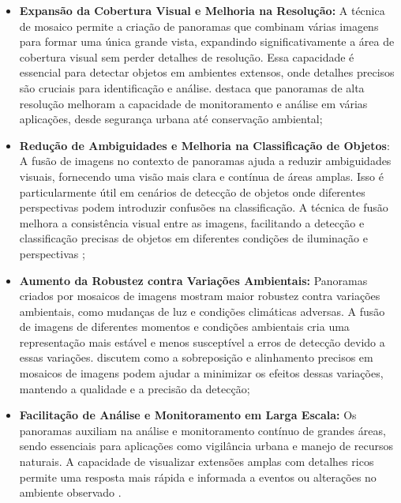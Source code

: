 \begin{itemize}

\item \textbf{Expansão da Cobertura Visual e Melhoria na Resolução:} A técnica de mosaico permite a criação de panoramas que combinam várias imagens para formar uma única grande vista, expandindo significativamente a área de cobertura visual sem perder detalhes de resolução. Essa capacidade é essencial para detectar objetos em ambientes extensos, onde detalhes precisos são cruciais para identificação e análise.  destaca que panoramas de alta resolução melhoram a capacidade de monitoramento e análise em várias aplicações, desde segurança urbana até conservação ambiental;

\item \textbf{Redução de Ambiguidades e Melhoria na Classificação de Objetos}: A fusão de imagens no contexto de panoramas ajuda a reduzir ambiguidades visuais, fornecendo uma visão mais clara e contínua de áreas amplas. Isso é particularmente útil em cenários de detecção de objetos onde diferentes perspectivas podem introduzir confusões na classificação. A técnica de fusão melhora a consistência visual entre as imagens, facilitando a detecção e classificação precisas de objetos em diferentes condições de iluminação e perspectivas \cite{Burt1983};

\item \textbf{Aumento da Robustez contra Variações Ambientais:} Panoramas criados por mosaicos de imagens mostram maior robustez contra variações ambientais, como mudanças de luz e condições climáticas adversas. A fusão de imagens de diferentes momentos e condições ambientais cria uma representação mais estável e menos susceptível a erros de detecção devido a essas variações.  discutem como a sobreposição e alinhamento precisos em mosaicos de imagens podem ajudar a minimizar os efeitos dessas variações, mantendo a qualidade e a precisão da detecção;

\item \textbf{Facilitação de Análise e Monitoramento em Larga Escala:}
Os panoramas auxiliam na análise e monitoramento contínuo de grandes áreas, sendo essenciais para aplicações como vigilância urbana e manejo de recursos naturais. A capacidade de visualizar extensões amplas com detalhes ricos permite uma resposta mais rápida e informada a eventos ou alterações no ambiente observado \cite{Torr2000}.

\end{itemize}


